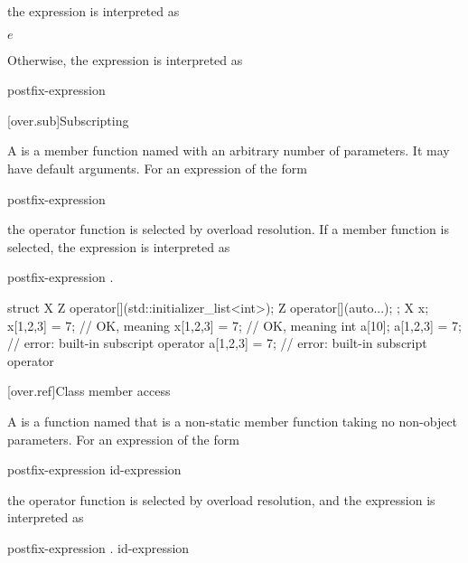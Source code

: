 the expression is interpreted as
\begin{ncsimplebnf}
$e$ \terminal{(}  \terminal{)}
\end{ncsimplebnf}
Otherwise, the expression is interpreted as
\begin{ncsimplebnf}
postfix-expression   \terminal{(}\terminal{)} \terminal{(}  \terminal{)}
\end{ncsimplebnf}

[over.sub]{Subscripting}%
%

\pnum
A 
is a member function named 
with an arbitrary number of parameters.
It may have default arguments.
For an expression of the form
\begin{ncsimplebnf}
postfix-expression \terminal{[}  \terminal{]}
\end{ncsimplebnf}
the operator function
is selected by overload resolution.
If a member function is selected,
the expression is interpreted as
\begin{ncsimplebnf}
postfix-expression .  \terminal{[}\terminal{]} \terminal{(}  \terminal{)}
\end{ncsimplebnf}

\pnum
\begin{example}
\begin{codeblock}
struct X {
  Z operator[](std::initializer_list<int>);
  Z operator[](auto...);
};
X x;
x[{1,2,3}] = 7;                 // OK, meaning 
x[1,2,3] = 7;                   // OK, meaning 
int a[10];
a[{1,2,3}] = 7;                 // error: built-in subscript operator
a[1,2,3] = 7;                   // error: built-in subscript operator
\end{codeblock}
\end{example}

[over.ref]{Class member access}
%

\pnum
A 
is a function named 
that is a non-static member function taking no non-object parameters.
For an expression of the form
\begin{ncsimplebnf}
postfix-expression \terminal{->}  id-expression
\end{ncsimplebnf}
the operator function
is selected by overload resolution,
and the expression is interpreted as
\begin{ncsimplebnf}
\terminal{(} postfix-expression .  \terminal{->} \terminal{(}\terminal{)} \terminal{)} \terminal{->}  id-expression
\end{ncsimplebnf}

